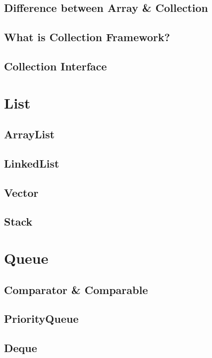 \documentclass[14pt,fleqn]{extbook} %
\begin{document}
\subsection{Difference between Array \& Collection}

\subsection{What is Collection Framework?}

\subsection{Collection Interface}

\section{List}

\subsection{ArrayList}

\subsection{LinkedList}

\subsection{Vector}

\subsection{Stack}

\section{Queue}

\subsection{Comparator \& Comparable}

\subsection{PriorityQueue}

\subsection{Deque}

\end{document}
